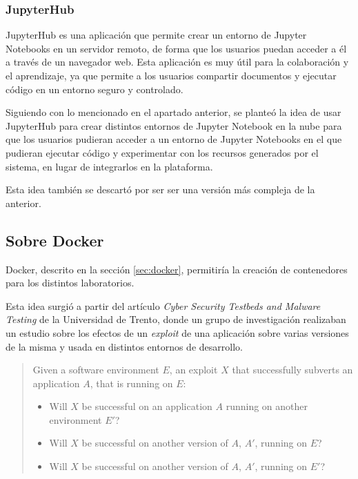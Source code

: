             \subsubsection{JupyterHub}

                JupyterHub \cite{jupyterhub} es una aplicación que permite crear un entorno de Jupyter Notebooks en un servidor remoto, de forma que los usuarios puedan acceder a él a través de un navegador web. Esta aplicación es muy útil para la colaboración y el aprendizaje, ya que permite a los usuarios compartir documentos y ejecutar código en un entorno seguro y controlado.
                
                Siguiendo con lo mencionado en el apartado anterior, se planteó la idea de usar JupyterHub para crear distintos entornos de Jupyter Notebook en la nube para que los usuarios pudieran acceder a un entorno de Jupyter Notebooks en el que pudieran ejecutar código y experimentar con los recursos generados por el sistema, en lugar de integrarlos en la plataforma.

                Esta idea también se descartó por ser ser una versión más compleja de la anterior.
                
                \newpage

                
        \subsection{Sobre Docker}

            Docker, descrito en la sección \ref{sec:docker}, permitiría la creación de contenedores para los distintos laboratorios.
                
            Esta idea surgió a partir del artículo \textit{Cyber Security Testbeds and Malware Testing} \cite{securitylab-malware-analysis} de la Universidad de Trento, donde un grupo de investigación realizaban un estudio sobre los efectos de un \textit{exploit} de una aplicación sobre varias versiones de la misma y usada en distintos entornos de desarrollo.

            \begin{quotation}
                
                Given a software environment $E$, an exploit $X$ that successfully subverts an application $A$, that is running on $E$:
                
                \begin{itemize}
                    \item Will $X$ be successful on an application $A$ running on another environment $E'$?
                    \item Will $X$ be successful on another version of $A$, $A'$, running on $E$?
                    \item Will $X$ be successful on another version of $A$, $A'$, running on $E'$?
                \end{itemize}

            \end{quotation}

